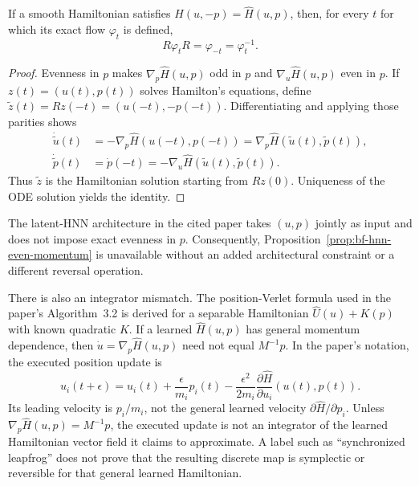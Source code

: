 \begin{proposition}
\label{prop:bf-hnn-even-momentum}
If a smooth Hamiltonian satisfies
$\widehat H(u,-p)=\widehat H(u,p)$, then, for every $t$ for which its exact
flow $\varphi_t$ is defined,
\begin{equation}
 R\varphi_tR=\varphi_{-t}=\varphi_t^{-1}.
\end{equation}
\end{proposition}

\begin{proof}
Evenness in $p$ makes $\nabla_p\widehat H(u,p)$ odd in $p$ and
$\nabla_u\widehat H(u,p)$ even in $p$.  If
$z(t)=(u(t),p(t))$ solves Hamilton's equations, define
$\widetilde z(t)=Rz(-t)=(u(-t),-p(-t))$.  Differentiating and applying those
parities shows
\begin{align}
 \dot{\widetilde u}(t)
 &=-\nabla_p\widehat H(u(-t),p(-t))
 =\nabla_p\widehat H(\widetilde u(t),\widetilde p(t)),\\
 \dot{\widetilde p}(t)
 &=\dot p(-t)
 =-\nabla_u\widehat H(\widetilde u(t),\widetilde p(t)).
\end{align}
Thus $\widetilde z$ is the Hamiltonian solution starting from $Rz(0)$.
Uniqueness of the ODE solution yields the identity.
\end{proof}

The latent-HNN architecture in the cited paper takes $(u,p)$ jointly as input
and does not impose exact evenness in $p$.  Consequently,
Proposition~\ref{prop:bf-hnn-even-momentum} is unavailable without an added
architectural constraint or a different reversal operation.

There is also an integrator mismatch.  The position-Verlet formula used in the
paper's Algorithm~3.2 is derived for a separable Hamiltonian
$\widehat U(u)+K(p)$ with known quadratic $K$.  If a learned
$\widehat H(u,p)$ has general momentum dependence, then
$\dot u=\nabla_p\widehat H(u,p)$ need not equal $M^{-1}p$.  In the paper's
notation, the executed position update is
\begin{equation}
 u_i(t+\epsilon)=u_i(t)+\frac{\epsilon}{m_i}p_i(t)
 -\frac{\epsilon^2}{2m_i}
  \frac{\partial\widehat H}{\partial u_i}(u(t),p(t)).
 \label{eq:bf-hnn-paper-position-update}
\end{equation}
Its leading velocity is $p_i/m_i$, not the general learned velocity
$\partial\widehat H/\partial p_i$.  Unless
$\nabla_p\widehat H(u,p)=M^{-1}p$, the executed update is not an integrator of
the learned Hamiltonian vector field it claims to approximate.  A label such as
``synchronized leapfrog'' does not prove that the resulting discrete map is
symplectic or reversible for that general learned Hamiltonian.

